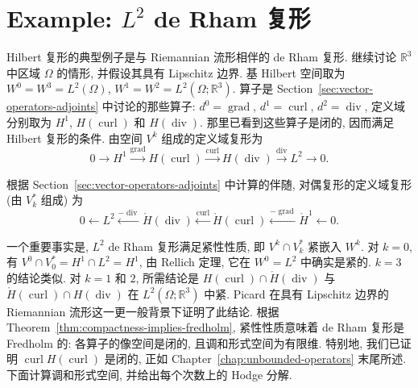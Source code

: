 \section{{Example: $L^2$ de Rham 复形}}\label{sec:l2-de-rham-complex}

{Hilbert 复形的典型例子是与 Riemannian 流形相伴的 de Rham 复形. 继续讨论 $\mathbb R^3$ 中区域 $\Omega$ 的情形, 并假设其具有 Lipschitz 边界. 基 Hilbert 空间取为 $W^0=W^3=L^2(\Omega)$, $W^1=W^2=L^2(\Omega;\mathbb R^3)$. 算子是 Section~\ref{sec:vector-operators-adjoints} 中讨论的那些算子: $d^0=\operatorname{grad}$, $d^1=\operatorname{curl}$, $d^2=\operatorname{div}$, 定义域分别取为 $H^1$, $H(\operatorname{curl})$ 和 $H(\operatorname{div})$. 那里已看到这些算子是闭的, 因而满足 Hilbert 复形的条件. 由空间 $V^k$ 组成的定义域复形为}
\begin{equation}\label{eq:l2-de-rham-domain-complex}
0\to H^1\xrightarrow{\operatorname{grad}}H(\operatorname{curl})\xrightarrow{\operatorname{curl}}H(\operatorname{div})\xrightarrow{\operatorname{div}}L^2\to0.
\end{equation}

{根据 Section~\ref{sec:vector-operators-adjoints} 中计算的伴随, 对偶复形的定义域复形 (由 $V_k^*$ 组成) 为}
\begin{equation}\label{eq:l2-dual-domain-complex}
0\leftarrow L^2\xleftarrow{-\operatorname{div}}\mathring H(\operatorname{div})\xleftarrow{\operatorname{curl}}\mathring H(\operatorname{curl})\xleftarrow{-\operatorname{grad}}\mathring H^1\leftarrow0.
\end{equation}

{一个重要事实是, $L^2$ de Rham 复形满足紧性性质, 即 $V^k\cap V_k^*$ 紧嵌入 $W^k$. 对 $k=0$, 有 $V^0\cap V_0^*=H^1\cap L^2=H^1$, 由 Rellich 定理, 它在 $W^0=L^2$ 中确实是紧的. $k=3$ 的结论类似. 对 $k=1$ 和 $2$, 所需结论是 $H(\operatorname{curl})\cap\mathring H(\operatorname{div})$ 与 $\mathring H(\operatorname{curl})\cap H(\operatorname{div})$ 在 $L^2(\Omega;\mathbb R^3)$ 中紧. Picard  在具有 Lipschitz 边界的 Riemannian 流形这一更一般背景下证明了此结论. 根据 Theorem~\ref{thm:compactness-implies-fredholm}, 紧性性质意味着 de Rham 复形是 Fredholm 的: 各算子的像空间是闭的, 且调和形式空间为有限维. 特别地, 我们已证明 $\operatorname{curl}H(\operatorname{curl})$ 是闭的, 正如 Chapter~\ref{chap:unbounded-operators} 末尾所述. 下面计算调和形式空间, 并给出每个次数上的 Hodge 分解.}

